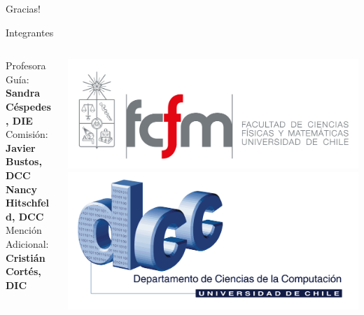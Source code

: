 \documentclass[aspectratio=169]{beamer}
\begin{document}
\begin{frame}[standout]
Gracias!
\end{frame}

\begin{frame}{Integrantes}
\begin{columns}
    \begin{column}{.5\textwidth}
        Profesora Guía:\\
        \textbf{Sandra Céspedes, DIE}\\
        \vspace{\belowdisplayskip}
        Comisión:\\
        \textbf{Javier Bustos, DCC}\\
        \textbf{Nancy Hitschfeld, DCC}\\
        \vspace{\belowdisplayskip}
        Mención Adicional:\\
        \textbf{Cristián Cortés, DIC}
    \end{column}%
    \begin{column}{.5\textwidth}
        \centering
        \includegraphics[height=.25\textheight]{figuras/fcfm_horizontal_png.png}\\
        \vspace{0.05\textheight}
        \includegraphics[height=.25\textheight]{figuras/dcc_antiguo_png.png}\\

\end{column}
\end{columns}
\end{frame}
\end{document}
